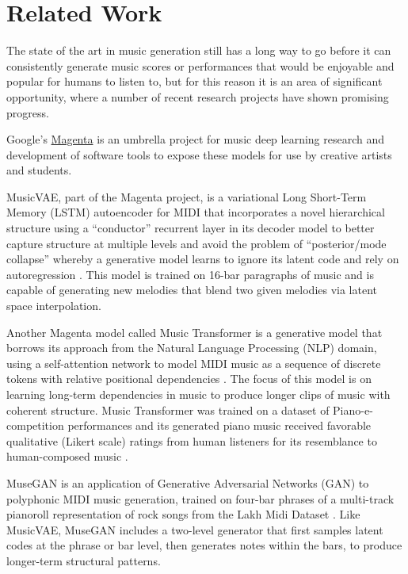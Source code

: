 \documentclass[sigconf,authorversion]{acmart}
\begin{document}
\section{Related Work}

The state of the art in music generation still has a long way to go
before it can consistently generate music scores or performances that
would be enjoyable and popular for humans to listen to, but for this
reason it is an area of significant opportunity, where a number of
recent research projects have shown promising progress.

Google's \href{https://magenta.tensorflow.org/}{Magenta} is an
umbrella project for music deep learning research and development of
software tools to expose these models for use by creative artists and
students.

MusicVAE, part of the Magenta project, is a variational Long
Short-Term Memory (LSTM) autoencoder for MIDI that incorporates a
novel hierarchical structure using a ``conductor'' recurrent layer in
its decoder model to better capture structure at multiple levels and
avoid the problem of ``posterior/mode collapse'' whereby a generative
model learns to ignore its latent code and rely on autoregression
\cite{roberts_hierarchical_2018}. This model is trained on 16-bar
paragraphs of music and is capable of generating new melodies that
blend two given melodies via latent space interpolation.

Another Magenta model called Music Transformer is a generative model
that borrows its approach from the Natural Language Processing (NLP)
domain, using a self-attention network to model MIDI music as a
sequence of discrete tokens with relative positional dependencies
\cite{huang_music_2018}. The focus of this model is on learning
long-term dependencies in music to produce longer clips of music with
coherent structure. Music Transformer was trained on a dataset of
Piano-e-competition performances \cite{hawthorne2019enabling} and its
generated piano music received favorable qualitative (Likert scale)
ratings from human listeners for its resemblance to human-composed
music \cite{huang_music_2018}.

MuseGAN \cite{dong2017musegan} is an application of Generative
Adversarial Networks (GAN) to polyphonic MIDI music generation,
trained on four-bar phrases of a multi-track pianoroll representation
of rock songs from the Lakh Midi Dataset
\cite{raffel_learning-based_2016}. Like MusicVAE, MuseGAN includes a
two-level generator that first samples latent codes at the phrase or
bar level, then generates notes within the bars, to produce
longer-term structural patterns.
\end{document}
